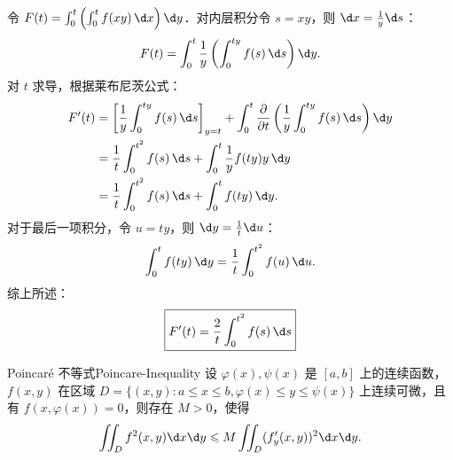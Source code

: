 \begin{myproof}
    令 $F(t) = \int_0^t \left( \int_0^t f(xy) \, \d x \right) \d y$．对内层积分令 $s = xy$，则 $\d x = \frac{1}{y} \d s$：
    \begin{equation}
        F(t) = \int_0^t \frac{1}{y} \left( \int_0^{ty} f(s) \, \d s \right) \d y.
    \end{equation}
    对 $t$ 求导，根据莱布尼茨公式：
    \begin{equation}
        \begin{aligned}
            F'(t) & = \left[ \frac{1}{y} \int_0^{ty} f(s) \, \d s \right]_{y=t} + \int_0^t \frac{\partial}{\partial t} \left( \frac{1}{y} \int_0^{ty} f(s) \, \d s \right) \d y \\
                  & = \frac{1}{t} \int_0^{t^2} f(s) \, \d s + \int_0^t \frac{1}{y} f(ty) y \, \d y                                                                              \\
                  & = \frac{1}{t} \int_0^{t^2} f(s) \, \d s + \int_0^t f(ty) \, \d y.
        \end{aligned}
    \end{equation}
    对于最后一项积分，令 $u = ty$，则 $\d y = \frac{1}{t} \d u$：
    \begin{equation}
        \int_0^t f(ty) \, \d y = \frac{1}{t} \int_0^{t^2} f(u) \, \d u.
    \end{equation}
    综上所述：
    \begin{equation}
        \boxed{F'(t) = \frac{2}{t} \int_0^{t^2} f(s) \, \d s}
    \end{equation}
\end{myproof}


\begin{problem}{Poincaré 不等式}{Poincare-Inequality}
    设 $\varphi(x), \psi(x)$ 是 $[a, b]$ 上的连续函数，$f(x, y)$ 在区域 $D = \{(x, y) : a \leqslant x \leqslant b, \varphi(x) \leqslant y \leqslant \psi(x)\}$ 上连续可微，且有 $f(x, \varphi(x)) = 0$，则存在 $M > 0$，使得
    \begin{equation}
        \iint_D f^2(x, y) \d x \d y \leqslant M \iint_D (f'_y(x, y))^2 \d x \d y.
    \end{equation}
\end{problem}

